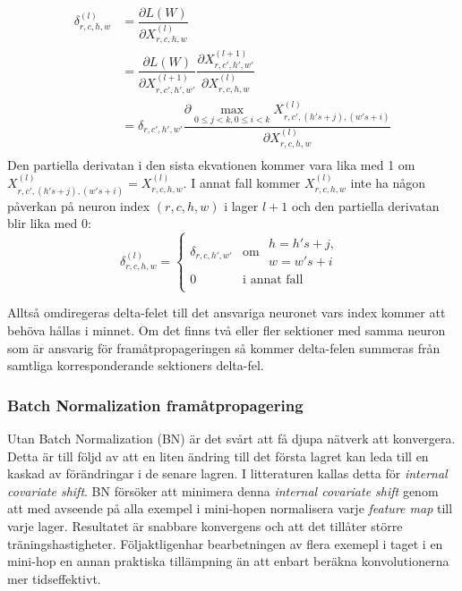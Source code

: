 \documentclass[a4paper,11pt,twoside]{article}
\newcommand*{\pd}[2]{\ensuremath{\dfrac{\partial #1}{\partial #2}}}
\begin{document}
\begin{equation}
\begin{split}
	\delta^{(l)}_{r,c,h,w}
		& = \pd{L(W)}{X^{(l)}_{r,c,h,w}} \\
		& = \pd{L(W)}{X^{(l+1)}_{r,c',h',w'}} \pd{X^{(l+1)}_{r,c',h',w'}}{X^{(l)}_{r,c,h,w}} \\
		& = \delta_{r,c',h',w'} \pd{\underset{0 \leq j < k,0 \leq i < k}{\max} X^{(l)}_{r,c',(h's+j),(w's+i)}}{X^{(l)}_{r,c,h,w}} \\
\end{split}
\end{equation}
Den partiella derivatan i den sista ekvationen kommer vara lika med 1 om $X^{(l)}_{r,c',(h's+j),(w's+i)} = X^{(l)}_{r,c,h,w}$. I annat fall kommer $X^{(l)}_{r,c,h,w}$ inte ha någon påverkan på neuron index ${(r,c,h,w)}$ i lager $l+1$ och den partiella derivatan blir lika med 0: \cite{cs231n} \cite{convmath} \cite{webconv3}
\begin{equation}
\delta^{(l)}_{r,c,h,w} = \begin{cases}
				\delta_{r,c,h',w'} & \mbox{om } \begin{split} h = h's+j, \\w = w's+i \end{split}\\
				0 & \mbox{i annat fall}\\
			\end{cases}
\end{equation}

Alltså omdiregeras delta-felet till det ansvariga neuronet vars index kommer att behöva hållas i minnet. Om det finns två eller fler sektioner med samma neuron som är ansvarig för framåtpropageringen så kommer delta-felen summeras från samtliga korresponderande sektioners delta-fel. \cite{cs231n} \cite{convmath} \cite{webconv3}

\subsubsection{Batch Normalization framåtpropagering}
Utan Batch Normalization (BN) är det svårt att få djupa nätverk att konvergera. Detta är till följd av att en liten ändring till det första lagret kan leda till en kaskad av förändringar i de senare lagren. I litteraturen kallas detta för \textit{internal covariate shift}. BN försöker att minimera denna \textit{internal covariate shift} genom att med avseende på alla exempel i mini-hopen normalisera varje \textit{feature map} till varje lager. Resultatet är snabbare konvergens och att det tillåter större träningshastigheter. Följaktligenhar bearbetningen av flera exemepl i taget i en mini-hop en annan praktiska tillämpning än att enbart beräkna konvolutionerna mer tidseffektivt. \cite{cs231n} \cite{batchnorm}
\end{document}
